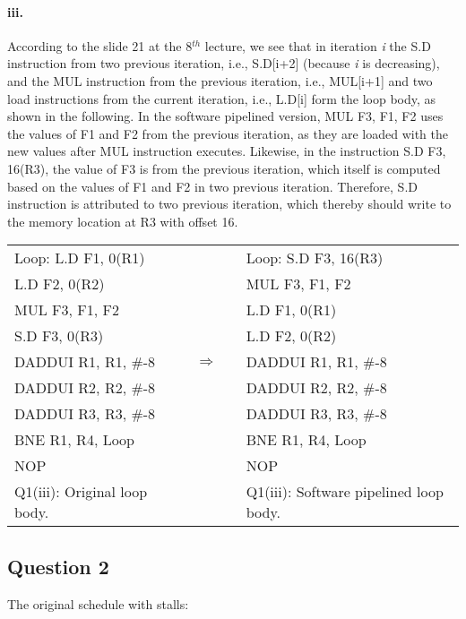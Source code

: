 \documentclass[11pt]{article}
\newcommand{\q}[1]{\subsection*{Question {#1}}}
\renewcommand{\part}[1]{\paragraph*{{#1}.}}
\newcommand{\code}[1]{\textsf{#1}}
\begin{document}
\part{iii} According to the slide 21 at the 8$^{th}$ lecture, we see that in iteration \textit{i} the \code{S.D} instruction from two previous iteration, i.e., \code{S.D[i+2]} (because \textit{i} is decreasing), and the \code{MUL} instruction from the previous iteration, i.e., \code{MUL[i+1]} and two load instructions from the current iteration, i.e., \code{L.D[i]} form the loop body, as shown in the following. In the software pipelined version, \code{MUL F3, F1, F2} uses the values of \code{F1} and \code{F2} from the previous iteration, as they are loaded with the new values after \code{MUL} instruction executes. Likewise, in the instruction \code{S.D F3, 16(R3)}, the value of \code{F3} is from the previous iteration, which itself is computed based on the values of \code{F1} and \code{F2} in two previous iteration. Therefore, \code{S.D} instruction is attributed to two previous iteration, which thereby should write to the memory location at \code{R3} with offset 16.

\begin{table}[h]
\center
\begin{tabular}{lcccl}
	  \code{Loop:} \code{L.D F1, 0(R1)} & & & &  \code{Loop:} \code{S.D F3, 16(R3)} \\
	 \code{L.D F2, 0(R2)}  & & & & \code{MUL F3, F1, F2}\\
	 \code{MUL F3, F1, F2}  & & & & \code{L.D F1, 0(R1)} \\
	 \code{S.D F3, 0(R3)} & & & & \code{L.D F2, 0(R2)} \\
	 \code{DADDUI R1, R1, \#-8} & & $\Rightarrow$ & & \code{DADDUI R1, R1, \#-8} \\
	 \code{DADDUI R2, R2, \#-8} & & & & \code{DADDUI R2, R2, \#-8} \\
	 \code{DADDUI R3, R3, \#-8} & & & & \code{DADDUI R3, R3, \#-8} \\
	 \code{BNE R1, R4, Loop} & & & & \code{BNE R1, R4, Loop} \\ 
	 \code{NOP} & & & & \code{NOP} \\
	 Q1(iii): Original loop body. & & & & Q1(iii): Software pipelined loop body.
\end{tabular}
\label{tbl:q1p3}
\end{table}

\q{2} The original schedule with stalls:
\end{document}
